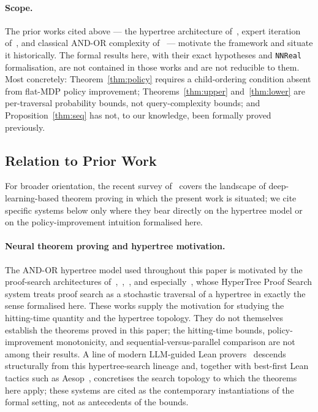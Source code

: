 \documentclass[reqno,11pt]{amsart}
\theoremstyle{plain}
\theoremstyle{definition}
\theoremstyle{remark}
\begin{document}
\paragraph{Scope.} The prior works cited above --- the hypertree architecture of~\citet{Lample2022}, expert iteration of~\citet{Anthony2017}, and classical AND-OR complexity of~\citet{Pearl1982,Tarsi1983,SaksWigderson1986} --- motivate the framework and situate it historically. The formal results here, with their exact hypotheses and \texttt{NNReal} formalisation, are not contained in those works and are not reducible to them. Most concretely: Theorem~\ref{thm:policy} requires a child-ordering condition absent from flat-MDP policy improvement; Theorems~\ref{thm:upper} and~\ref{thm:lower} are per-traversal probability bounds, not query-complexity bounds; and Proposition~\ref{thm:seq} has not, to our knowledge, been formally proved previously.

\subsection{Relation to Prior Work}

For broader orientation, the recent survey of~\citet{LiSunMurphy2024} covers the landscape of deep-learning-based theorem proving in which the present work is situated; we cite specific systems below only where they bear directly on the hypertree model or on the policy-improvement intuition formalised here.

\paragraph{Neural theorem proving and hypertree motivation.} The AND-OR hypertree model used throughout this paper is motivated by the proof-search architectures of~\citet{YangDeng2019},~\citet{PoluHan2020},~\citet{Han2021}, and especially~\citet{Lample2022}, whose HyperTree Proof Search system treats proof search as a stochastic traversal of a hypertree in exactly the sense formalised here. These works supply the motivation for studying the hitting-time quantity and the hypertree topology. They do not themselves establish the theorems proved in this paper; the hitting-time bounds, policy-improvement monotonicity, and sequential-versus-parallel comparison are not among their results. A line of modern LLM-guided Lean provers~\citep{LeanDojo2023,Llemma2023,DeepSeekProver2024,GoedelProver2025,KiminaProver2025} descends structurally from this hypertree-search lineage and, together with best-first Lean tactics such as Aesop~\citep{Aesop2023}, concretises the search topology to which the theorems here apply; these systems are cited as the contemporary instantiations of the formal setting, not as antecedents of the bounds.
\end{document}
